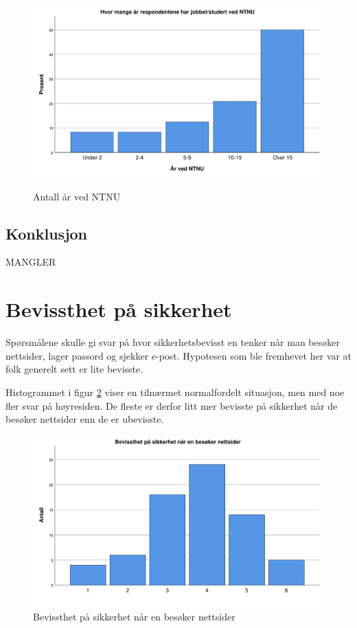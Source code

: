 \begin{figure}[H]
    \centering
    \includegraphics[scale=0.5]{case_2/bilder/spss/aarvedNTNU.pdf}
    \label{fig:aarvedNTNU}
    \caption[aarvedNTNU]{Antall år ved NTNU}
\end{figure}


\subsection{Konklusjon}
MANGLER
\section{Bevissthet på sikkerhet}
Spørsmålene skulle gi svar på hvor sikkerhetsbevisst en tenker når man besøker nettsider, lager passord og sjekker e-post. Hypotesen som ble fremhevet her var at folk generelt sett er lite bevisste. 

Histogrammet i figur \ref{fig:bevisst-nettsider} viser en tilnærmet normalfordelt situasjon, men med noe fler svar på høyresiden. De fleste er derfor litt mer bevisste på sikkerhet når de besøker nettsider enn de er ubevisste. 
\begin{figure}[H]
    \centering
    \includegraphics[scale=0.5]{case_2/bilder/spss/bevisst_nettsider.pdf}
    \caption[bevisst-nettsider]{Bevissthet på sikkerhet når en besøker nettsider}
    \label{fig:bevisst-nettsider}
\end{figure}

